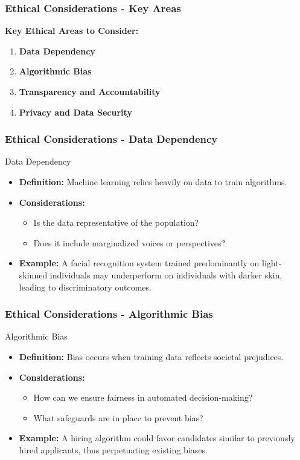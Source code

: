\documentclass[aspectratio=169]{beamer}
\begin{document}
\begin{frame}[fragile]
    \frametitle{Ethical Considerations - Key Areas}
    \textbf{Key Ethical Areas to Consider:}
    \begin{enumerate}
        \item \textbf{Data Dependency}
        \item \textbf{Algorithmic Bias}
        \item \textbf{Transparency and Accountability}
        \item \textbf{Privacy and Data Security}
    \end{enumerate}
\end{frame}

\begin{frame}[fragile]
    \frametitle{Ethical Considerations - Data Dependency}
    \begin{block}{Data Dependency}
        \begin{itemize}
            \item \textbf{Definition:} Machine learning relies heavily on data to train algorithms.
            \item \textbf{Considerations:}
            \begin{itemize}
                \item Is the data representative of the population?
                \item Does it include marginalized voices or perspectives?
            \end{itemize}
            \item \textbf{Example:} A facial recognition system trained predominantly on light-skinned individuals may underperform on individuals with darker skin, leading to discriminatory outcomes.
        \end{itemize}
    \end{block}
\end{frame}

\begin{frame}[fragile]
    \frametitle{Ethical Considerations - Algorithmic Bias}
    \begin{block}{Algorithmic Bias}
        \begin{itemize}
            \item \textbf{Definition:} Bias occurs when training data reflects societal prejudices.
            \item \textbf{Considerations:}
            \begin{itemize}
                \item How can we ensure fairness in automated decision-making?
                \item What safeguards are in place to prevent bias?
            \end{itemize}
            \item \textbf{Example:} A hiring algorithm could favor candidates similar to previously hired applicants, thus perpetuating existing biases.
        \end{itemize}
    \end{block}
\end{frame}
\end{document}
